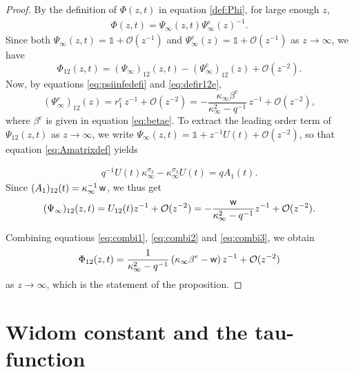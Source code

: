 \documentclass[a4paper,reqno,11pt]{amsart}
\numberwithin{equation}{section}
\numberwithin{figure}{section}
\theoremstyle{plain}
\theoremstyle{remark}
\DeclareMathOperator{\sfw}{{\sf w}}
\numberwithin{rhp}{section}
\begin{document}
\begin{proof}
  By the definition of $\Phi(z,t)$ in equation \eqref{def:Phi}, for large enough $z$,
    \begin{align}
        \Phi(z,t) = \Psi_\infty(z,t) \Psi_\infty^e(z)^{-1}.
    \end{align}
Since both $\Psi_\infty(z,t)=\mathbb{1}+\mathcal{O}(z^{-1})$ and $\Psi_\infty^e(z)=\mathbb{1}+\mathcal{O}(z^{-1})$ as $z\rightarrow \infty$, we have
\begin{equation}\label{eq:combi1}
      \Phi_{12}(z,t) =(\Psi_\infty)_{12}(z,t)-(\Psi_\infty^e)_{12}(z)+\mathcal{O}(z^{-2}).
\end{equation}
Now, by equations \eqref{eq:psiinfedefi} and \eqref{eq:defir12e},
\begin{equation}\label{eq:combi2}
    (\Psi_\infty^e)_{12}(z)=r_1^e\, z^{-1}+\mathcal{O}(z^{-2})=-\frac{\kappa_\infty \beta^e}{\kappa_{\infty}^2-q^{-1}}\, z^{-1}+\mathcal{O}(z^{-2}),
\end{equation}
where $\beta^e$ is given in equation \eqref{eq:betae}.
To extract the leading order term of $\Psi_{12}(z,t)$ as $z\rightarrow \infty$, we write $\Psi_\infty(z,t)=\mathbb{1}+z^{-1}U(t)+\mathcal{O}(z^{-2})$, so that equation \eqref{eq:Amatrixdef} yields

    \begin{align}
        q^{-1} U(t)\kappa_{\infty}^{\sigma_3} - \kappa_{\infty}^{\sigma_3}U(t) = q A_1(t). 
    \end{align}
  Since $(A_1)_{12}(t)=\kappa_{\infty}^{-1} \sfw$, we thus get
\begin{equation}\label{eq:combi3}
    (\Psi_\infty)_{12}(z,t)=U_{12}(t)z^{-1}+\mathcal{O}(z^{-2})=-\frac{\sfw}{\kappa_{\infty}^2-q^{-1}}z^{-1}+\mathcal{O}(z^{-2}).
\end{equation}

Combining equations \eqref{eq:combi1}, \eqref{eq:combi2} and \eqref{eq:combi3}, we obtain
    \begin{equation*}
    \Phi_{12}(z,t)=\frac{1}{\kappa_{\infty}^2-q^{-1}} \left(\kappa_\infty \beta^e-\sfw\right)z^{-1}+\mathcal{O}{(z^{-2})}
\end{equation*}
as $z\rightarrow \infty$, which is the statement of the proposition.
\end{proof}
    








\section{Widom constant and the tau-function}\label{sec:widom}
\end{document}

